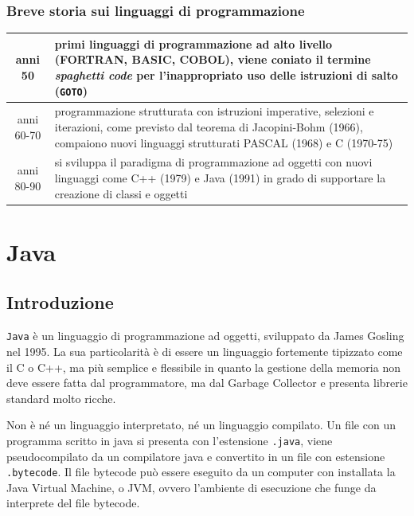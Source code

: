 \documentclass{article}
\begin{document}
\subsubsection*{Breve storia sui linguaggi di programmazione}
\begin{center}
	\begin{tabularx}{\textwidth}{c X}
		anni 50
		& primi linguaggi di programmazione ad alto livello (FORTRAN, BASIC, COBOL), viene coniato il
		termine \textit{spaghetti code} per l'inappropriato uso delle istruzioni di salto (\verb|GOTO|) \\
		\midrule
		
		anni 60-70
		& programmazione strutturata con istruzioni imperative, selezioni e iterazioni, come previsto dal teorema di
		Jacopini-Bohm (1966), compaiono nuovi linguaggi strutturati PASCAL (1968) e C (1970-75) \\
		\midrule

		anni 80-90
		& si sviluppa il paradigma di programmazione ad oggetti con nuovi linguaggi come C++ (1979) e Java
		(1991) in grado di supportare la creazione di classi e oggetti
	\end{tabularx}
\end{center}


\section{Java}
\subsection{Introduzione}
\verb|Java| è un linguaggio di programmazione ad oggetti, sviluppato da James Gosling nel 1995. La sua particolarità è di
essere un linguaggio fortemente tipizzato come il C o C++, ma più semplice e flessibile in quanto la gestione
della memoria non deve essere fatta dal programmatore, ma dal Garbage Collector e presenta librerie standard molto ricche.

Non è né un linguaggio interpretato, né un linguaggio compilato. Un file con un programma scritto in java si presenta con
l'estensione \verb|.java|, viene pseudocompilato da un compilatore java e convertito in un file con estensione \verb|.bytecode|.
Il file bytecode può essere eseguito da un computer con installata la Java Virtual Machine, o JVM, ovvero l'ambiente di
esecuzione che funge da interprete del file bytecode.
\end{document}
